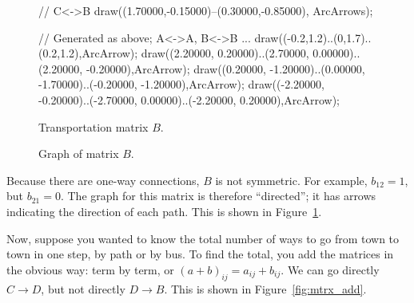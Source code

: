 \documentclass[../textbook.tex]{subfiles}
\begin{document}
\begin{figure}[h]
\begin{center}
\begin{minipage}[b]{0.45\textwidth}
\begin{asy}[width=0.7\textwidth]
				// C<->B
				draw((1.70000,-0.15000)--(0.30000,-0.85000), ArcArrows);

				// Generated as above; A<->A, B<->B ...
				draw((-0.2,1.2)..(0,1.7)..(0.2,1.2),ArcArrow);
				draw((2.20000, 0.20000)..(2.70000, 0.00000)..(2.20000, -0.20000),ArcArrow);
				draw((0.20000, -1.20000)..(0.00000, -1.70000)..(-0.20000, -1.20000),ArcArrow);
				draw((-2.20000, -0.20000)..(-2.70000, 0.00000)..(-2.20000, 0.20000),ArcArrow);
			\end{asy}
		\end{minipage}
	\end{center}
	\vspace*{-2\baselineskip}
	\begin{center}
		\begin{minipage}[t]{0.45\textwidth}
			\caption{Transportation matrix $B$.}
			\label{fig:adjacency_b}
		\end{minipage}
		\hfill
		\begin{minipage}[t]{0.45\textwidth}
			\caption{Graph of matrix $B$.}
			\label{fig:directed}
		\end{minipage}
	\end{center}
	\vspace*{-2\baselineskip}
\end{figure}

\noindent Because there are one-way connections, $B$ is not symmetric. For example, $b_{12}=1$, but $b_{21}=0$. The graph for this matrix is therefore ``directed''; it has arrows indicating the direction of each path. This is shown in Figure~\ref{fig:directed}.

Now, suppose you wanted to know the total number of ways to go from town to town in one step, by path or by bus. To find the total, you add the matrices in the obvious way: term by term, or $(a+b)_{ij}=a_{ij}+b_{ij}$. We can go directly $C\to D$, but not directly $D\to B$. This is shown in Figure~\ref{fig:mtrx_add}.
\end{document}
